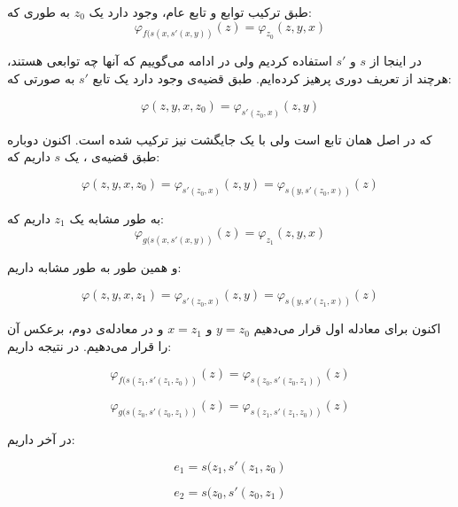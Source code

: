 طبق ترکیب توابع و تابع عام، وجود دارد یک $z_0$
به طوری که:
$$
\varphi_{f( s(x,s'(x,y) )}(z) = \varphi_{z_0}(z,y,x)
$$

در اینجا از $s$ و $s'$ استفاده کردیم ولی در ادامه می‌گوییم که آنها چه توابعی هستند، هرچند از تعریف دوری پرهیز کرده‌ایم. طبق قضیه‌ی  وجود دارد یک تابع $s'$ به صورتی که:

$$
\varphi(z,y,x,z_0) = \varphi_{s'(z_0, x)}(z,y)
$$

که در اصل همان تابع  است ولی با یک جایگشت نیز ترکیب شده است. اکنون دوباره طبق  قضیه‌ی ، یک $s$ داریم که:

$$
\varphi(z,y,x,z_0) = \varphi_{s'(z_0, x)}(z,y) = \varphi_{s(y,s'(z_0, x))}(z)
$$

به طور مشابه یک $z_1$ داریم که:
$$
\varphi_{g( s(x,s'(x,y) )}(z) = \varphi_{z_1}(z,y,x)
$$

و همین طور به طور مشابه داریم:

$$
\varphi(z,y,x,z_1) = \varphi_{s'(z_0, x)}(z,y) = \varphi_{s(y,s'(z_1, x))}(z)
$$


اکنون برای معادله اول قرار می‌دهیم $y=z_0$ و $x=z_1$ و در معادله‌ی دوم، برعکس آن را قرار می‌دهیم. در نتیجه داریم:

$$
\varphi_{f( s(z_1,s'(z_1,z_0) )}(z) = \varphi_{s(z_0,s'(z_0, z_1))}(z)
$$

$$
\varphi_{g( s(z_0,s'(z_0,z_1) )}(z) = \varphi_{s(z_1,s'(z_1, z_0))}(z)
$$

در آخر داریم:

$$
e_1 = s(z_1,s'(z_1,z_0) 
$$

$$
e_2 = s(z_0,s'(z_0,z_1)
$$